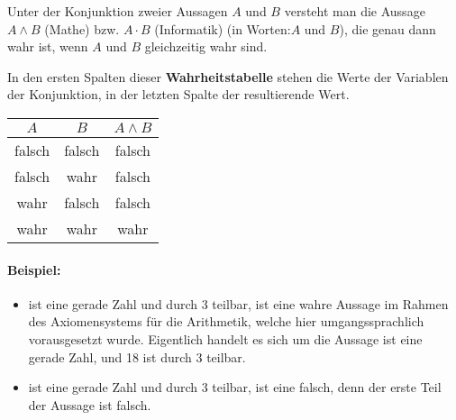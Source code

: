 \begin{definition}[Konjunktion]
Unter der Konjunktion zweier Aussagen $A$ und $B$ versteht man die Aussage $A \land B$ (Mathe) bzw. $A \cdot B$ (Informatik) (in Worten:\glqq $A$ und $B$\grqq ), die genau dann wahr ist, wenn $A$ und $B$ gleichzeitig wahr sind.
\end{definition}
In den ersten Spalten dieser \textbf{Wahrheitstabelle} stehen die Werte der Variablen der Konjunktion, in der letzten Spalte der resultierende Wert.
\begin{center}
\begin{tabular}{c|c||c}
 $A$& $B$  &  $A \land B$  \\ 
\hline
\cellcolor{ared} falsch & \cellcolor{ared} falsch & \cellcolor{ared} falsch   \\ 
\cellcolor{ared} falsch & \cellcolor{agreen} wahr & \cellcolor{ared} falsch  \\ 
\cellcolor{agreen} wahr & \cellcolor{ared} falsch & \cellcolor{ared} falsch   \\ 
\cellcolor{agreen} wahr & \cellcolor{agreen} wahr & \cellcolor{agreen} wahr  \\ 
\hline
\end{tabular}
\end{center}

\paragraph*{Beispiel:}
\begin{itemize}
	\item {} ist eine gerade Zahl und durch 3 teilbar\grqq , ist eine wahre Aussage im Rahmen des Axiomensystems für die Arithmetik, welche hier umgangssprachlich vorausgesetzt wurde. Eigentlich handelt es sich um die Aussage  ist eine gerade Zahl, und 18 ist durch 3 teilbar\grqq .
	\item {} ist eine gerade Zahl und durch 3 teilbar\grqq, ist eine falsch, denn der erste Teil der Aussage ist falsch.
\end{itemize}

